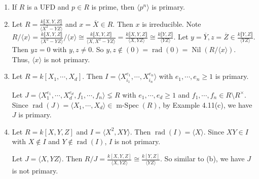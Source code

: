 \begin{example}
    \begin{enumerate}
        \item If $R$ is a UFD and $p \in R$ is prime, then $\langle p^{n} \rangle$ is primary.
        \item Let $R = \frac{k\llbracket X,Y ,Z \rrbracket}{\langle X^{2}-YZ \rangle}$ and $x = \overbar{X} \in R$. Then $x$ is irreducible. Note $R/\langle x \rangle = \frac{k\llbracket X,Y,Z \rrbracket}{\langle X^{2}-YZ \rangle}/\langle x \rangle \cong \frac{k\llbracket X,Y,Z \rrbracket}{\langle X,X^{2}-YZ \rangle} = \frac{k\llbracket X,Y,Z \rrbracket}{\langle X,YZ \rangle} \cong  \frac{k\llbracket Y,Z \rrbracket}{\langle YZ \rangle}$. Let $y = \overbar{Y}, z = \overbar{Z} \in \frac{k\llbracket Y,Z \rrbracket}{\langle YZ \rangle}$. Then $yz = 0$ with $y,z \neq 0$. So $y,z \not \in (0) = \operatorname{rad}(0) = \operatorname{Nil}(R/\langle x \rangle)$. Thus, $\langle x \rangle$ is not primary.
        \item Let $R = k[X_1,\cdots,X_d]$. Then $I = \langle X_{i_1}^{e_1}, \cdots ,X_{i_n}^{e_n} \rangle$ with $e_1,\cdots,e_n \geq 1$ is primary. \par
            Let $J = \langle X_{1}^{e_1},\cdots,X_d^{e_d},f_1,\cdots,f_n \rangle \lneq R$ with $e_1,\cdots,e_d \geq 1$ and $f_1,\cdots,f_n \in R \setminus R^{\times}$. Since $\operatorname{rad}(J) = \langle X_{1},\cdots,X_d \rangle \in \operatorname{m-Spec}(R)$, by Example 4.11(c), we have $J$ is primary.
        \item Let $R = k[X,Y,Z]$ and $I = \langle X^{2},XY\rangle$. Then $\operatorname{rad}(I) = \langle X \rangle$. Since $XY \in I$ with $X \not\in I$ and $Y \not\in \operatorname{rad}(I)$, $I$ is not primary. \par 
            Let $J = \langle X,YZ \rangle$. Then $R/J = \frac{k[X,Y,Z]}{\langle X,YZ \rangle} \cong \frac{k[Y,Z]}{\langle YZ \rangle}$. So similar to (b), we have $J$ is not primary.
    \end{enumerate}
\end{example}


